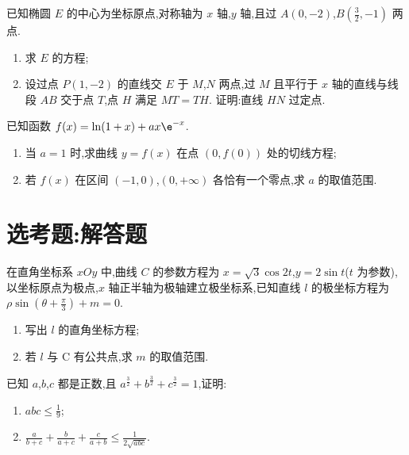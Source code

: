 \begin{problem}
已知椭圆 \(E\) 的中心为坐标原点,对称轴为 \(x\) 轴,\(y\) 轴,且过 \(A(0,-2)\),\(B\left( \frac{3}{2},-1 \right)\) 两点.
\begin{enumerate}
\item 求 \(E\) 的方程;
\item 设过点 \(P(1,-2)\) 的直线交 \(E\) 于 \(M\),\(N\) 两点,过 \(M\) 且平行于 \(x\) 轴的直线与线段 \(AB\) 交于点 \(T\),点 \(H\) 满足 \(MT=TH\). 证明:直线 \(HN\) 过定点.
\end{enumerate}
\end{problem}

\begin{problem}
已知函数 \(f(x)=\ln(1+x)+ax\e^{-x}\).
\begin{enumerate}
\item 当 \(a=1\) 时,求曲线 \(y=f(x)\) 在点 \(\left( 0,f(0) \right)\) 处的切线方程;
\item 若 \(f(x)\) 在区间 \((-1,0)\),\((0,+\infty)\) 各恰有一个零点,求 \(a\) 的取值范围.
\end{enumerate}
\end{problem}

\section{选考题:解答题}

\begin{problem}
在直角坐标系 \(xOy\) 中,曲线 \(C\) 的参数方程为 \(x=\sqrt{3}\cos 2t\),\(y=2\sin t\)(\(t\) 为参数),以坐标原点为极点,\(x\) 轴正半轴为极轴建立极坐标系,已知直线 \(l\) 的极坐标方程为 \( \rho \sin \left( \theta+\frac{\pi}{3} \right)+m=0 \).
\begin{enumerate}
\item 写出 \(l\) 的直角坐标方程;
\item 若 \(l\) 与 C 有公共点,求 \(m\) 的取值范围.
\end{enumerate}
\end{problem}

\begin{problem}
已知 \(a\),\(b\),\(c\) 都是正数,且 \(a^{\frac{3}{2}}+b^{\frac{3}{2}}+c^{\frac{3}{2}}=1\),证明:
\begin{enumerate}
\item \(abc\le \frac{1}{9}\);
\item \(\frac{a}{b+c}+\frac{b}{a+c}+\frac{c}{a+b}\le \frac{1}{2\sqrt{abc}}\).
\end{enumerate}
\end{problem}

